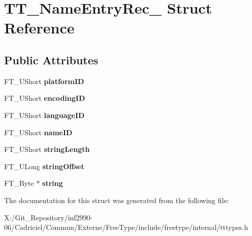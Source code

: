 \hypertarget{struct_t_t___name_entry_rec__}{\section{T\-T\-\_\-\-Name\-Entry\-Rec\-\_\- Struct Reference}
\label{struct_t_t___name_entry_rec__}
}
\subsection*{Public Attributes}
\begin{DoxyCompactItemize}
\item 
\hypertarget{struct_t_t___name_entry_rec___a9d4ee8bc42ed087f4533b6f664c0f6c6}{F\-T\-\_\-\-U\-Short {\bfseries platform\-I\-D}}\label{struct_t_t___name_entry_rec___a9d4ee8bc42ed087f4533b6f664c0f6c6}

\item 
\hypertarget{struct_t_t___name_entry_rec___a8e7403a2f37c7f7fdb3c19e9549d315c}{F\-T\-\_\-\-U\-Short {\bfseries encoding\-I\-D}}\label{struct_t_t___name_entry_rec___a8e7403a2f37c7f7fdb3c19e9549d315c}

\item 
\hypertarget{struct_t_t___name_entry_rec___a2ec03c0ff0c542f403b45a515bb20afb}{F\-T\-\_\-\-U\-Short {\bfseries language\-I\-D}}\label{struct_t_t___name_entry_rec___a2ec03c0ff0c542f403b45a515bb20afb}

\item 
\hypertarget{struct_t_t___name_entry_rec___abdaaec01d6620b3801f233cde5964548}{F\-T\-\_\-\-U\-Short {\bfseries name\-I\-D}}\label{struct_t_t___name_entry_rec___abdaaec01d6620b3801f233cde5964548}

\item 
\hypertarget{struct_t_t___name_entry_rec___a736e5f8caeada86cc33f62acca6537f5}{F\-T\-\_\-\-U\-Short {\bfseries string\-Length}}\label{struct_t_t___name_entry_rec___a736e5f8caeada86cc33f62acca6537f5}

\item 
\hypertarget{struct_t_t___name_entry_rec___a33ed41d4d3c4fffa74193f3b52e11870}{F\-T\-\_\-\-U\-Long {\bfseries string\-Offset}}\label{struct_t_t___name_entry_rec___a33ed41d4d3c4fffa74193f3b52e11870}

\item 
\hypertarget{struct_t_t___name_entry_rec___aefa752d5c88149f8e64122e14855d831}{F\-T\-\_\-\-Byte $\ast$ {\bfseries string}}\label{struct_t_t___name_entry_rec___aefa752d5c88149f8e64122e14855d831}

\end{DoxyCompactItemize}


The documentation for this struct was generated from the following file\-:\begin{DoxyCompactItemize}
\item 
X\-:/\-Git\-\_\-\-Repository/inf2990-\/06/\-Cadriciel/\-Commun/\-Externe/\-Free\-Type/include/freetype/internal/tttypes.\-h\end{DoxyCompactItemize}
